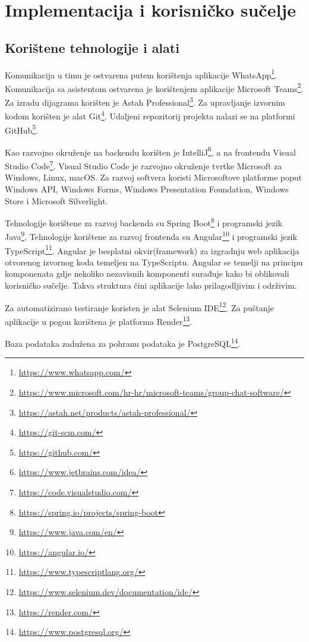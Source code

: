 \chapter{Implementacija i korisničko sučelje}
		
		
		\section{Korištene tehnologije i alati}
		
		Komunikacija u timu je ostvarena putem korištenja aplikacije WhatsApp\footnote{\url{https://www.whatsapp.com/}}. Komunikacija sa asistentom ostvarena je korištenjem aplikacije Microsoft Teams\footnote{\url{https://www.microsoft.com/hr-hr/microsoft-teams/group-chat-software/}}. Za izradu dijagrama korišten je Astah Professional\footnote{\url{https://astah.net/products/astah-professional/}}. Za upravljanje izvornim kodom korišten je alat Git\footnote{\url{https://git-scm.com/}}. Udaljeni repozitorij projekta nalazi se na platformi GitHub\footnote{\url{https://github.com/}}.
		
		Kao razvojno okruženje na backendu korišten je IntelliJ\footnote{\url{https://www.jetbrains.com/idea/}}, a na frontendu Visual Studio Code\footnote{\url{https://code.visualstudio.com/}}. Visual Studio Code je razvojno okruženje tvrtke Microsoft za Windows, Linux, macOS. Za razvoj softvera koristi Microsoftove platforme poput Windows API, Windows Forms, Windows Presentation Foundation, Windows Store i Microsoft Silverlight.
		
		Tehnologije korištene za razvoj backenda su Spring Boot\footnote{\url{https://spring.io/projects/spring-boot}} i programski jezik Java\footnote{\url{https://www.java.com/en/}}. Tehnologije korištene za razvoj frontenda su Angular\footnote{\url{https://angular.io/}} i programski jezik TypeScript\footnote{\url{https://www.typescriptlang.org/}}. Angular je besplatni okvir(framework) za izgradnju web aplikacija otvorenog izvornog koda temeljen na TypeScriptu. Angular se temelji na principu komponenata gdje nekoliko nezavisnih komponenti surađuje kako bi oblikovali korisničko sučelje. Takva struktura čini aplikacije lako prilagodljivim i održivim.
		
		Za automatizirano testiranje koristen je alat Selenium IDE\footnote{\url{https://www.selenium.dev/documentation/ide/}}. Za puštanje aplikacije u pogon korištena je platforma Render\footnote{\url{https://render.com/}}.
		
		Baza podataka zadužena za pohranu podataka je PostgreSQL\footnote{\url{https://www.postgresql.org/}}.
		
